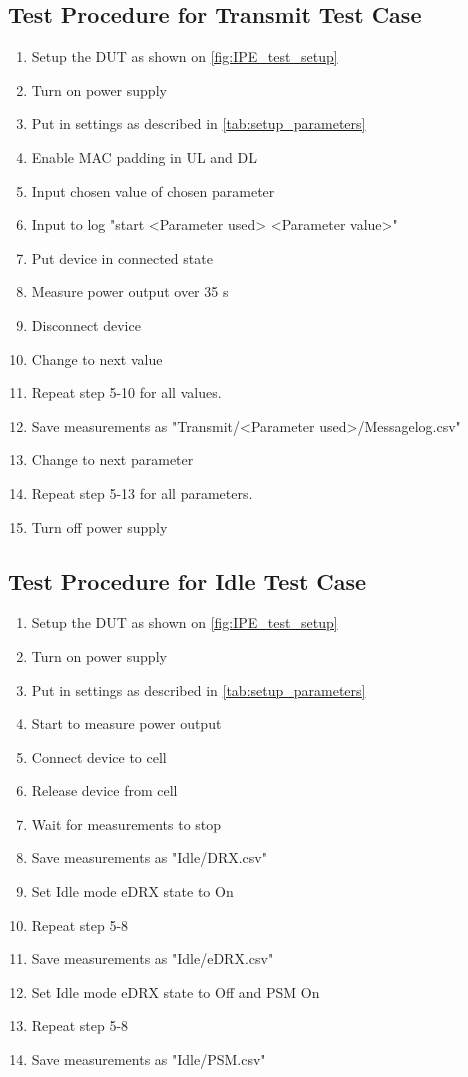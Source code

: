\subsection{Test Procedure for Transmit Test Case}
\begin{enumerate}
\item Setup the \gls{DUT} as shown on \autoref{fig:IPE_test_setup}
\item Turn on power supply 
\item Put in settings as described in \autoref{tab:setup_parameters} 
\item Enable MAC padding in UL and DL
\item Input chosen value of chosen parameter
\item Input to log "start <Parameter used> <Parameter value>"
\item Put device in connected state
\item Measure power output over 35 s
\item Disconnect device
\item Change to next value
\item Repeat step 5-10 for all values.
\item Save measurements as "Transmit/<Parameter used>/Messagelog.csv"
\item Change to next parameter
\item Repeat step 5-13 for all parameters.
\item Turn off power supply
\end{enumerate}

\subsection{Test Procedure for Idle Test Case}
\begin{enumerate}
\item Setup the \gls{DUT} as shown on \autoref{fig:IPE_test_setup}
\item Turn on power supply 
\item Put in settings as described in \autoref{tab:setup_parameters}
\item Start to measure power output
\item Connect device to cell
\item Release device from cell
\item Wait for measurements to stop
\item Save measurements as "Idle/DRX.csv"
\item Set Idle mode eDRX state to On
\item Repeat step 5-8
\item Save measurements as "Idle/eDRX.csv"
\item Set Idle mode eDRX state to Off and PSM On
\item Repeat step 5-8
\item Save measurements as "Idle/PSM.csv"
\end{enumerate}